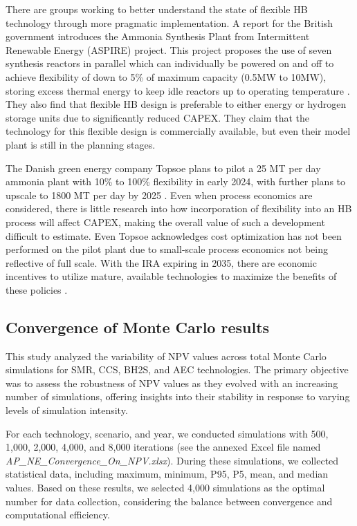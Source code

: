 \documentclass{article}
\begin{document}
There are groups working to better understand the state of flexible HB technology through more pragmatic implementation. A report for the British government introduces the Ammonia Synthesis Plant from Intermittent Renewable Energy (ASPIRE) project. This project proposes the use of seven synthesis reactors in parallel which can individually be powered on and off to achieve flexibility of down to 5\% of maximum capacity (0.5MW to 10MW), storing excess thermal energy to keep idle reactors up to operating temperature \cite{Davenne2022}. They also find that flexible HB design is preferable to either energy or hydrogen storage units due to significantly reduced CAPEX. They claim that the technology for this flexible design is commercially available, but even their model plant is still in the planning stages.

The Danish green energy company Topsoe plans to pilot a 25 MT per day ammonia plant with 10\% to 100\% flexibility in early 2024, with further plans to upscale to 1800 MT per day by 2025 \cite{Rouwenhorst2023}. Even when process economics are considered, there is little research into how incorporation of flexibility into an HB process will affect CAPEX, making the overall value of such a development difficult to estimate. Even Topsoe acknowledges cost optimization has not been performed on the pilot plant due to small-scale process economics not being reflective of full scale. With the IRA expiring in 2035, there are economic incentives to utilize mature, available technologies to maximize the benefits of these policies \cite{Rouwenhorst2023}.

\subsection{Convergence of Monte Carlo results}

This study analyzed the variability of NPV values across total Monte Carlo simulations for SMR, CCS, BH2S, and AEC technologies. The primary objective was to assess the robustness of NPV values as they evolved with an increasing number of simulations, offering insights into their stability in response to varying levels of simulation intensity.

For each technology, scenario, and year, we conducted simulations with 500, 1,000, 2,000, 4,000, and 8,000 iterations (see the annexed Excel file named \textit{AP\_NE\_Convergence\_On\_NPV.xlsx}). During these simulations, we collected statistical data, including maximum, minimum, P95, P5, mean, and median values. Based on these results, we selected 4,000 simulations as the optimal number for data collection, considering the balance between convergence and computational efficiency.
\end{document}
